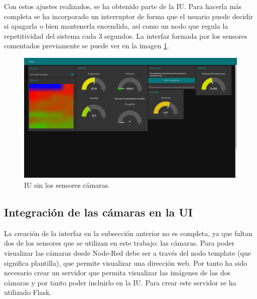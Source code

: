 Con estos ajustes realizados, se ha obtenido parte de la IU. Para hacerla más completa se ha incorporado un interruptor de forma que el usuario puede decidir si apagarla o bien mantenerla encendida, así como un nodo que regula la repetitividad del sistema cada 3 segundos. La interfaz formada por los sensores comentados previamente se puede ver en la imagen \ref{fig:ui_nocams}.
\begin{figure} [h!]
  \begin{center}
    \includegraphics[width=16cm]{figs/ui_nocams}
  \end{center}
  \caption{IU sin los sensores cámaras.}
  \label{fig:ui_nocams}
\end{figure}

\subsection{Integración de las cámaras en la UI}
La creación de la interfaz en la subsección anterior no es completa, ya que faltan dos de los sensores que se utilizan en este trabajo: las cámaras. Para poder visualizar las cámaras desde Node-Red debe ser a través del nodo template (que significa plantilla), que permite visualizar una dirección web. Por tanto ha sido necesario crear un servidor que permita visualizar las imágenes de las dos cámaras y por tanto poder incluirlo en la IU. Para crear este servidor se ha utilizado Flask.\\

